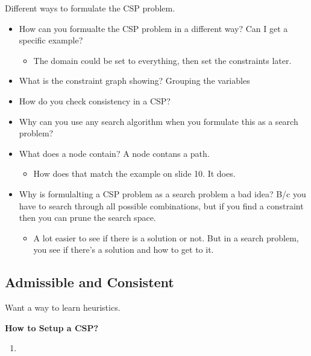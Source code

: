 \begin{summary}
    
\end{summary}

\begin{example}
    Different ways to formulate the CSP problem. 
    \begin{itemize}
        \item How can you formualte the CSP problem in a different way? Can I get a specific example?
        \begin{itemize}
            \item The domain could be set to everything, then set the constraints later.
        \end{itemize}
        \item What is the constraint graph showing? Grouping the variables
        \item How do you check consistency in a CSP?
        \item Why can you use any search algorithm when you formulate this as a search problem? 
        \item What does a node contain? A node contans a path. 
        \begin{itemize}
            \item How does that match the example on slide 10. It does. 
        \end{itemize}
        \item Why is formulalting a CSP problem as a search problem a bad idea? B/c you have to search through all possible combinations, but if you find a constraint then you can prune the search space.
        \begin{itemize}
            \item A lot easier to see if there is a solution or not. But in a search problem, you see if there's a solution and how to get to it. 
        \end{itemize}
    \end{itemize}
\end{example}

\subsection{Admissible and Consistent}
\begin{summary}
    Want a way to learn heuristics.
\end{summary}
\newpage

\begin{process} \textbf{How to Setup a CSP?}
    \begin{enumerate}
        \item 
    \end{enumerate}
\end{process}

